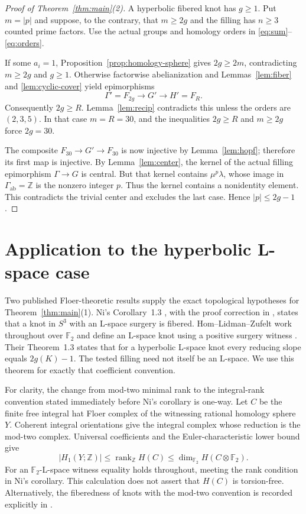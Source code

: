 \documentclass[11pt]{article}
\theoremstyle{remark}
\newcommand{\Z}{\mathbb Z}
\newcommand{\F}{\mathbb F_2}
\newcommand{\ab}{\mathrm{ab}}
\newcommand{\rk}{\operatorname{rank}}
\begin{document}
\begin{proof}[Proof of Theorem~\ref{thm:main}(2)]
A hyperbolic fibered knot has $g\geq1$. Put $m=|p|$ and suppose, to the contrary, that $m\geq2g$ and the filling has $n\geq3$ counted prime factors. Use the actual groups and homology orders in \eqref{eq:sum}--\eqref{eq:orders}.

If some $a_i=1$, Proposition~\ref{prop:homology-sphere} gives $2g\geq2m$, contradicting $m\geq2g$ and $g\geq1$. Otherwise factorwise abelianization and Lemmas~\ref{lem:fiber} and \ref{lem:cyclic-cover} yield epimorphisms
\[
 \Gamma'=F_{2g}\longrightarrow G'\longrightarrow H'=F_R.
\]
Consequently $2g\geq R$. Lemma~\ref{lem:recip} contradicts this unless the orders are $(2,3,5)$. In that case $m=R=30$, and the inequalities $2g\geq R$ and $m\geq2g$ force $2g=30$.

The composite $F_{30}\to G'\to F_{30}$ is now injective by Lemma~\ref{lem:hopf}; therefore its first map is injective. By Lemma~\ref{lem:center}, the kernel of the actual filling epimorphism $\Gamma\to G$ is central. But that kernel contains $\mu^p\lambda$, whose image in $\Gamma_{\ab}=\Z$ is the nonzero integer $p$. Thus the kernel contains a nonidentity element. This contradicts the trivial center and excludes the last case. Hence $|p|\leq2g-1$.
\end{proof}

\section{Application to the hyperbolic L-space case}\label{sec:floer}

Two published Floer-theoretic results supply the exact topological hypotheses for Theorem~\ref{thm:main}(1). Ni's Corollary~1.3 \cite{Ni}, with the proof correction in \cite{NiErr}, states that a knot in $S^3$ with an L-space surgery is fibered. Hom--Lidman--Zufelt work throughout over $\F$ and define an L-space knot using a positive surgery witness \cite[Section~1, p.~2]{HLZ}. Their Theorem~1.3 states that for a hyperbolic L-space knot every reducing slope equals $2g(K)-1$. The tested filling need not itself be an L-space. We use this theorem for exactly that coefficient convention.

For clarity, the change from mod-two minimal rank to the integral-rank convention stated immediately before Ni's corollary is one-way. Let $C$ be the finite free integral hat Floer complex of the witnessing rational homology sphere $Y$. Coherent integral orientations give the integral complex whose reduction is the mod-two complex. Universal coefficients and the Euler-characteristic lower bound give
\begin{equation}\label{eq:UCT}
 |H_1(Y;\Z)|\leq\rk_{\Z}H(C)
 \leq\dim_{\F}H(C\otimes\F).
\end{equation}
For an $\F$-L-space witness equality holds throughout, meeting the rank condition in Ni's corollary. This calculation does not assert that $H(C)$ is torsion-free. Alternatively, the fiberedness of knots with the mod-two convention is recorded explicitly in \cite[Section~1]{HLZ}.
\end{document}

